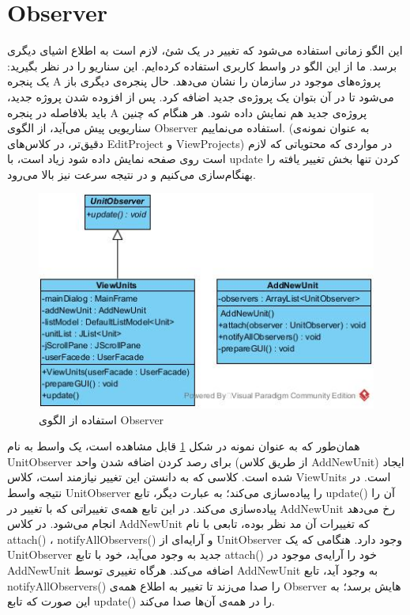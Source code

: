 \newpage
\section{Observer}
این الگو زمانی استفاده می‌شود که تغییر در یک شئ، لازم است به اطلاع اشیای دیگری برسد. ما از این الگو در واسط کاربری استفاده کرده‌ایم. این سناریو را در نظر بگیرید: یک پنجره  A پروژه‌های موجود در سازمان را نشان می‌دهد. حال پنجره‌ی دیگری باز می‌شود تا در آن بتوان یک پروژه‌ی جدید اضافه کرد. پس از افزوده شدن پروژه جدید، باید بلافاصله در پنجره A پروژه‌ی جدید هم نمایش داده شود. هر هنگام که چنین سناریویی پیش می‌آید، از الگوی Observer استفاده می‌نماییم. (به عنوان نمونه‌ی دقیق‌تر، در کلاس‌های EditProject و ViewProjects) در مواردی که محتویاتی که لازم است روی صفحه نمایش داده شود زیاد است، با update کردن تنها بخش تغییر یافته را بهنگام‌سازی می‌کنیم و در نتیجه سرعت نیز بالا می‌رود.


\begin{figure}[H]
	\centering
	\includegraphics[scale=0.5]{img/pattern/observer}
	\caption{  استفاده از الگوی Observer}
	\label{f202}
\end{figure}

همان‌طور که به عنوان نمونه در شکل
\ref{f202}
قابل مشاهده است، یک واسط
به نام UnitObserver برای رصد کردن اضافه شدن واحد (از طریق کلاس AddNewUnit) ایجاد شده است. کلاسی که به دانستن این تغییر نیازمند است، کلاس ViewUnits است. در نتیجه واسط UnitObserver را پیاده‌سازی می‌کند؛ به عبارت دیگر، تابع update() آن را پیاده‌سازی می‌کند. در این تابع همه‌ی تغییراتی که با تغییر در AddNewUnit رخ می‌دهد انجام می‌شود. در کلاس AddNewUnit که تغییرات آن مد نظر بوده، تابعی با نام attach() ، notifyAllObservers() و  آرایه‌ای از UnitObserver وجود دارد. هنگامی  که یک UnitObserver  جدید به وجود می‌آید، خود با تابع attach() خود را آرایه‌ی موجود در AddNewUnit اضافه می‌کند. هرگاه تغییری توسط AddNewUnit به وجود آید، تابع notifyAllObservers() را صدا می‌زند تا تغییر به اطلاع همه‌ی Observer هایش برسد؛ به این صورت که تابع update() را در همه‌ی آن‌ها صدا می‌کند.


